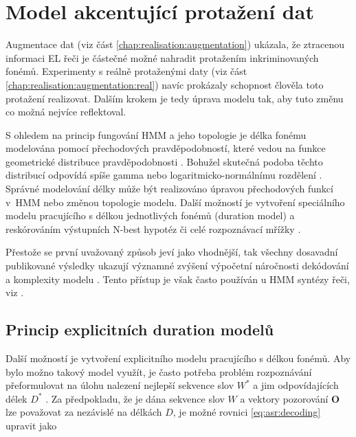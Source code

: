 \section{Model akcentující protažení dat}
\label{chap:realisation:durationmodels}

Augmentace dat (viz část \ref{chap:realisation:augmentation}) ukázala, že ztracenou informaci EL řeči je částečné možné nahradit protažením inkriminovaných fonémů.
Experimenty s reálně protaženými daty (viz část \ref{chap:realisation:augmentation:real}) navíc prokázaly schopnost člověla toto protažení realizovat.
Dalším krokem je tedy úprava modelu tak, aby tuto změnu co možná nejvíce reflektoval.

S ohledem na princip fungování HMM a jeho topologie je délka fonému modelována pomocí přechodových pravděpodobností, které vedou na funkce geometrické distribuce pravděpodobnosti \cite{Rabiner1989}.
Bohužel skutečná podoba těchto distribucí odpovídá spíše gamma nebo logaritmicko-normálnímu rozdělení \cite{Alumae2014}.
Správné modelování délky může být realizováno úpravou přechodových funkcí v~HMM nebo změnou topologie modelu.
Další možností je vytvoření speciálního modelu pracujícího s délkou jednotlivých fonémů (duration model) a reskórováním výstupních N-best hypotéz či celé rozpoznávací mřížky \cite{Alumae2014} \cite{Anastasakos1995}
\cite{Gadde2000}.

Přestože se první uvažovaný způsob jeví jako vhodnější, tak všechny dosavadní publikované výsledky ukazují významné zvýšení výpočetní náročnosti dekódování a komplexity modelu \cite{Rabiner1989} \cite{Pylkkonen2004} \cite{Russell1985}. Tento přístup je však často používán u HMM syntézy řeči, viz \cite{Yoshimura1998}.

\subsection{Princip explicitních duration modelů}
\label{chap:realisation:durationmodels:model}

Další možností je vytvoření explicitního modelu pracujícího s délkou fonémů. Aby bylo možno takový model využít, je často potřeba problém rozpoznávání přeformulovat na úlohu nalezení nejlepší sekvence slov $W^{*}$ a jim odpovídajících délek $D^{*}$ \cite{Alumae2014}. Za předpokladu, že je dána sekvence slov $W$ a vektory pozorování $\boldsymbol{O}$ lze považovat za nezávislé na délkách $D$, je možné rovnici \ref{eq:asr:decoding} upravit jako

